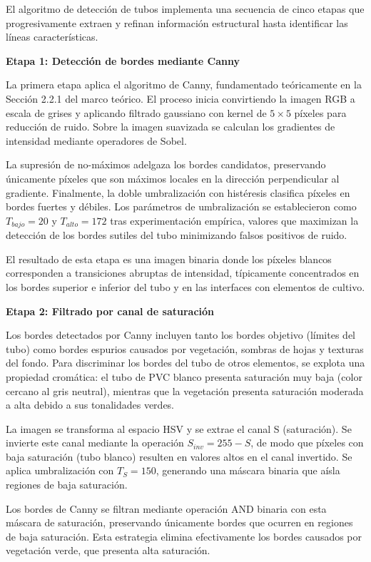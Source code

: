 El algoritmo de detección de tubos implementa una secuencia de cinco etapas que progresivamente extraen y refinan información estructural hasta identificar las líneas características.

\textbf{Etapa 1: Detección de bordes mediante Canny}

La primera etapa aplica el algoritmo de Canny, fundamentado teóricamente en la Sección 2.2.1 del marco teórico. El proceso inicia convirtiendo la imagen RGB a escala de grises y aplicando filtrado gaussiano con kernel de $5 \times 5$ píxeles para reducción de ruido. Sobre la imagen suavizada se calculan los gradientes de intensidad mediante operadores de Sobel.

La supresión de no-máximos adelgaza los bordes candidatos, preservando únicamente píxeles que son máximos locales en la dirección perpendicular al gradiente. Finalmente, la doble umbralización con histéresis clasifica píxeles en bordes fuertes y débiles. Los parámetros de umbralización se establecieron como $T_{bajo} = 20$ y $T_{alto} = 172$ tras experimentación empírica, valores que maximizan la detección de los bordes sutiles del tubo minimizando falsos positivos de ruido.

El resultado de esta etapa es una imagen binaria donde los píxeles blancos corresponden a transiciones abruptas de intensidad, típicamente concentrados en los bordes superior e inferior del tubo y en las interfaces con elementos de cultivo.

\textbf{Etapa 2: Filtrado por canal de saturación}

Los bordes detectados por Canny incluyen tanto los bordes objetivo (límites del tubo) como bordes espurios causados por vegetación, sombras de hojas y texturas del fondo. Para discriminar los bordes del tubo de otros elementos, se explota una propiedad cromática: el tubo de PVC blanco presenta saturación muy baja (color cercano al gris neutral), mientras que la vegetación presenta saturación moderada a alta debido a sus tonalidades verdes.

La imagen se transforma al espacio HSV y se extrae el canal S (saturación). Se invierte este canal mediante la operación $S_{inv} = 255 - S$, de modo que píxeles con baja saturación (tubo blanco) resulten en valores altos en el canal invertido. Se aplica umbralización con $T_S = 150$, generando una máscara binaria que aísla regiones de baja saturación.

Los bordes de Canny se filtran mediante operación AND binaria con esta máscara de saturación, preservando únicamente bordes que ocurren en regiones de baja saturación. Esta estrategia elimina efectivamente los bordes causados por vegetación verde, que presenta alta saturación.

